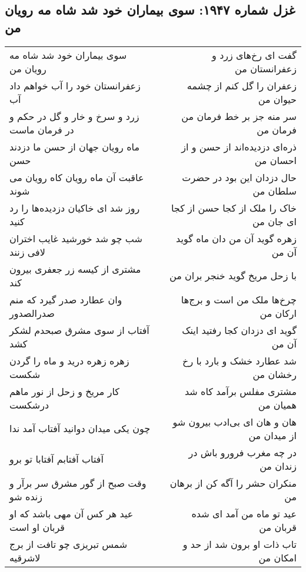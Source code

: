 \begin{center}
\section*{غزل شماره ۱۹۴۷: سوی بیماران خود شد شاه مه رویان من}
\label{sec:1947}
\begin{longtable}{l p{0.5cm} r}
سوی بیماران خود شد شاه مه رویان من
&&
گفت ای رخ‌های زرد و زعفرانستان من
\\
زعفرانستان خود را آب خواهم داد آب
&&
زعفران را گل کنم از چشمه حیوان من
\\
زرد و سرخ و خار و گل در حکم و در فرمان ماست
&&
سر منه جز بر خط فرمان من فرمان من
\\
ماه رویان جهان از حسن ما دزدند حسن
&&
ذره‌ای دزدیده‌اند از حسن و از احسان من
\\
عاقبت آن ماه رویان کاه رویان می شوند
&&
حال دزدان این بود در حضرت سلطان من
\\
روز شد ای خاکیان دزدیده‌ها را رد کنید
&&
خاک را ملک از کجا حسن از کجا ای جان من
\\
شب چو شد خورشید غایب اختران لافی زنند
&&
زهره گوید آن من دان ماه گوید آن من
\\
مشتری از کیسه زر جعفری بیرون کند
&&
با زحل مریخ گوید خنجر بران من
\\
وان عطارد صدر گیرد که منم صدرالصدور
&&
چرخ‌ها ملک من است و برج‌ها ارکان من
\\
آفتاب از سوی مشرق صبحدم لشکر کشد
&&
گوید ای دزدان کجا رفتید اینک آن من
\\
زهره زهره درید و ماه را گردن شکست
&&
شد عطارد خشک و بارد با رخ رخشان من
\\
کار مریخ و زحل از نور ماهم درشکست
&&
مشتری مفلس برآمد کاه شد همیان من
\\
چون یکی میدان دوانید آفتاب آمد ندا
&&
هان و هان ای بی‌ادب بیرون شو از میدان من
\\
آفتاب آفتابم آفتابا تو برو
&&
در چه مغرب فرورو باش در زندان من
\\
وقت صبح از گور مشرق سر برآر و زنده شو
&&
منکران حشر را آگه کن از برهان من
\\
عید هر کس آن مهی باشد که او قربان او است
&&
عید تو ماه من آمد ای شده قربان من
\\
شمس تبریزی چو تافت از برج لاشرقیه
&&
تاب ذات او برون شد از حد و امکان من
\\
\end{longtable}
\end{center}
